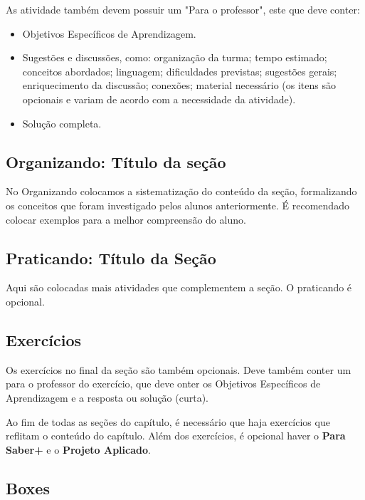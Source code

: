 As atividade também devem possuir um "Para o professor", este que deve conter:
\begin{itemize}
\item Objetivos Específicos de Aprendizagem.
\item Sugestões e discussões, como: organização da turma; tempo estimado; conceitos abordados; linguagem; dificuldades previstas; sugestões gerais; enriquecimento da discussão; conexões; material necessário (os itens são opcionais e variam de acordo com a necessidade da atividade).
\item Solução completa.
\end{itemize}

\def\currentcolor{session4}
\subsection{Organizando: Título da seção}

No Organizando colocamos a sistematização do conteúdo da seção, formalizando os conceitos que foram investigado pelos alunos anteriormente. É recomendado colocar exemplos para a melhor compreensão do aluno.

\def\currentcolor{session2}
\subsection{Praticando: Título da Seção}

Aqui são colocadas mais atividades que complementem a seção. O praticando é opcional.

\def\currentcolor{primario}
\subsection{Exercícios}

Os exercícios no final da seção são também opcionais. Deve também conter um para o professor do exercício, que deve onter os Objetivos Específicos de Aprendizagem e a resposta ou solução (curta).


Ao fim de todas as seções do capítulo, é necessário que haja exercícios que reflitam o conteúdo do capítulo. Além dos exercícios, é opcional haver o \textcolor{session3}{\textbf{Para Saber+}} e o \textcolor{cor2}{\textbf{Projeto Aplicado}}.

\def\currentcolor{session3}
\subsection{Boxes}

